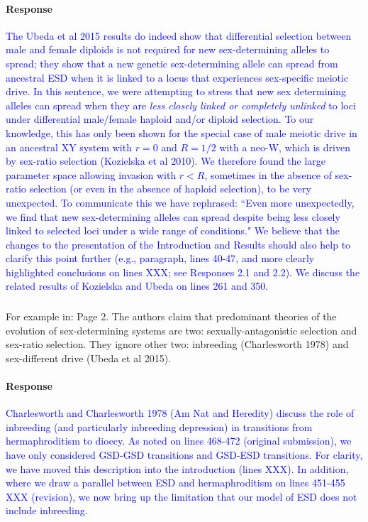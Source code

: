 \documentclass[10pt,letterpaper]{article}
\begin{document}
\noindent\paragraph{Response}
\textcolor{blue}{The Ubeda et al 2015 results do indeed show that differential selection between male and female diploids is not required for new sex-determining alleles to spread; they show that a new genetic sex-determining allele can spread from ancestral ESD when it is linked to a locus that experiences sex-specific meiotic drive. 
In this sentence, we were attempting to stress that new sex determining alleles can spread when they are \textit{less closely linked or completely unlinked} to loci under differential male/female haploid and/or diploid selection. 
To our knowledge, this has only been shown for the special case of male meiotic drive in an ancestral XY system with $r=0$ and $R=1/2$ with a neo-W, which is driven by sex-ratio selection (Kozielska et al 2010). 
We therefore found the large parameter space allowing invasion with $r<R$, sometimes in the absence of sex-ratio selection (or even in the absence of haploid selection), to be very unexpected.
}
\textcolor{blue}{To communicate this we have rephrased: ``Even more unexpectedly, we find that new sex-determining alleles can spread despite being less closely linked to selected loci under a wide range of conditions." 
We believe that the changes to the presentation of the Introduction and Results should also help to clarify this point further (e.g., paragraph, lines 40-47, and more clearly highlighted conclusions on lines XXX; see Responses 2.1 and 2.2).  }
\textcolor{blue}{We discuss the related results of Kozielska and Ubeda on lines 261 and 350.}

\noindent\subsubsection{}
For example in: Page 2. The authors claim that predominant theories of the evolution of sex-determining systems are two: sexually-antagonistic selection and sex-ratio selection. They ignore other two: inbreeding (Charlesworth 1978) and sex-different drive (Ubeda et al 2015). 

\noindent\paragraph{Response}
\textcolor{blue}{
Charlesworth and Charlesworth 1978 (Am Nat and Heredity) discuss the role of inbreeding (and particularly inbreeding depression) in transitions from hermaphroditism to dioecy. 
As noted on lines 468-472 (original submission), we have only considered GSD-GSD transitions and GSD-ESD transitions.
For clarity, we have moved this description into the introduction (lines XXX). 
In addition, where we draw a parallel between ESD and hermaphroditism on lines 451-455 XXX (revision), we now bring up the limitation that our model of ESD does not include inbreeding. }
\end{document}
